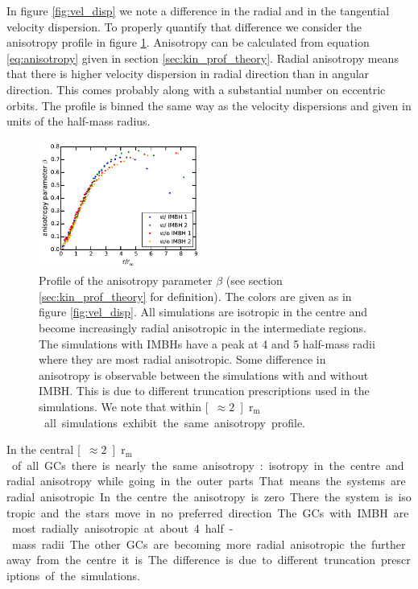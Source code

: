 \par In figure \ref{fig:vel_disp} we note a difference in the radial and in the tangential velocity dispersion. To properly quantify that difference we consider the anisotropy profile in figure \ref{fig:anisotropy_param}. Anisotropy can be calculated from equation \eqref{eq:anisotropy} given in section \ref{sec:kin_prof_theory}.  Radial anisotropy means that there is higher velocity dispersion in radial direction than in angular direction. This comes probably along with a substantial number on eccentric orbits. The profile is binned the same way as the velocity dispersions and given in units of the half-mass radius.
\begin{figure}[htbp]
	\centering
	\includegraphics[width=0.475\textwidth]{Plots/anisotropy_parameter_beta.pdf}
	\caption{Profile of the anisotropy parameter \(\beta\) (see section \ref{sec:kin_prof_theory} for definition). The colors are given as in figure \ref{fig:vel_disp}. All simulations are isotropic in the centre and become increasingly radial anisotropic in the intermediate regions. The simulations with \acp{IMBH} have a peak at 4 and 5 half-mass radii where they are most radial anisotropic. Some difference in anisotropy is observable between the simulations with and without \ac{IMBH}. This is due to different truncation prescriptions used in the simulations. We note that within \unit[\(\approx 2\)]{\(\mathrm{r_m}\)} all simulations exhibit the same anisotropy profile.}
	\label{fig:anisotropy_param}
\end{figure}
In the central \unit[\(\approx 2\)]{\(\mathrm{r_m}\)} of all \acp{GC} there is nearly the same anisotropy: isotropy in the centre and radial anisotropy while going in the outer parts. That means the systems are radial anisotropic. In the centre the anisotropy is zero. There the system is isotropic and the stars move in no preferred direction. The \acp{GC} with \ac{IMBH} are most radially anisotropic at about 4 half-mass radii. The other \acp{GC} are becoming more radial anisotropic the further away from the centre it is. The difference is due to different truncation prescriptions of the simulations.

